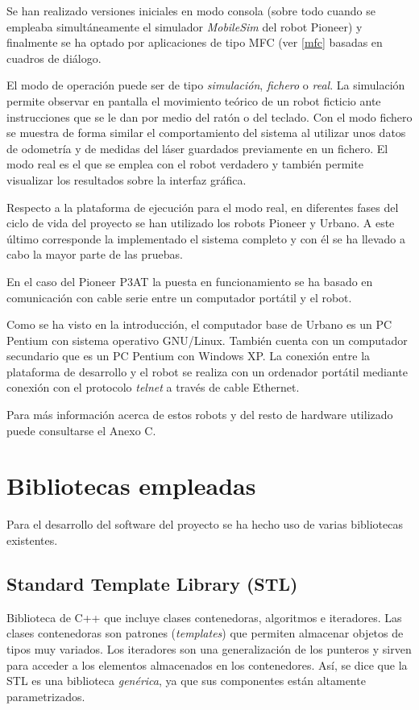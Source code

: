 Se han realizado versiones iniciales en modo consola (sobre todo cuando se empleaba simultáneamente el simulador \emph{MobileSim} del robot Pioneer) y finalmente se ha optado por aplicaciones de tipo MFC (ver \ref{mfc} basadas en cuadros de diálogo.

El modo de operación puede ser de tipo \emph{simulación}, \emph{fichero} o \emph{real}. La simulación permite observar en pantalla el movimiento teórico de un robot ficticio ante instrucciones que se le dan por medio del ratón o del teclado. Con el modo fichero se muestra de forma similar el comportamiento del sistema al utilizar unos datos de odometría y de medidas del láser guardados previamente en un fichero. El modo real es el que se emplea con el robot verdadero y también permite visualizar los resultados sobre la interfaz gráfica.

Respecto a la plataforma de ejecución para el modo real, en diferentes fases del ciclo de vida del proyecto se han utilizado los robots Pioneer y Urbano. A este último corresponde la implementado el sistema completo y con él se ha llevado a cabo la mayor parte de las pruebas.

En el caso del Pioneer P3AT la puesta en funcionamiento se ha basado en comunicación con cable serie entre un computador portátil y el robot.

Como se ha visto en la introducción, el computador base de Urbano es un PC Pentium con sistema operativo GNU/Linux. También cuenta con un computador secundario que es un PC Pentium con Windows XP. La conexión entre la plataforma de desarrollo y el robot se realiza con un ordenador portátil mediante conexión con el protocolo \emph{telnet} a través de cable Ethernet.

Para más información acerca de estos robots y del resto de hardware utilizado puede consultarse el Anexo C.

\section{Bibliotecas empleadas}
Para el desarrollo del software del proyecto se ha hecho uso de varias bibliotecas existentes.

\subsection{Standard Template Library (STL)}

Biblioteca de C++ que incluye clases contenedoras, algoritmos e iteradores. Las clases contenedoras son patrones (\emph{templates}) que permiten almacenar objetos de tipos muy variados. Los iteradores son una generalización de los punteros y sirven para acceder a los elementos almacenados en los contenedores. Así, se dice que la STL es una biblioteca \emph{genérica}, ya que sus componentes están altamente parametrizados.

